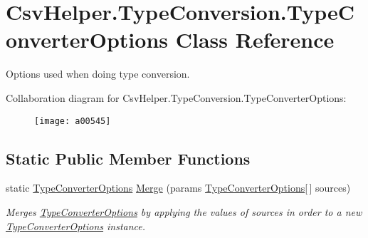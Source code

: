 \hypertarget{a00156}{\section{Csv\-Helper.\-Type\-Conversion.\-Type\-Converter\-Options Class Reference}
\label{a00156}
}


Options used when doing type conversion.  




Collaboration diagram for Csv\-Helper.\-Type\-Conversion.\-Type\-Converter\-Options\-:
\nopagebreak
\begin{figure}[H]
\begin{center}
\leavevmode
\texttt{[image: a00545]}
\end{center}
\end{figure}
\subsection*{Static Public Member Functions}
\begin{DoxyCompactItemize}
\item 
static \hyperlink{a00156}{Type\-Converter\-Options} \hyperlink{a00156_a0532694cffc600fe984e10c7f1375e0a}{Merge} (params \hyperlink{a00156}{Type\-Converter\-Options}\mbox{[}$\,$\mbox{]} sources)
\begin{DoxyCompactList}\small\item\em Merges \hyperlink{a00156}{Type\-Converter\-Options} by applying the values of sources in order to a new \hyperlink{a00156}{Type\-Converter\-Options} instance. \end{DoxyCompactList}\end{DoxyCompactItemize}
